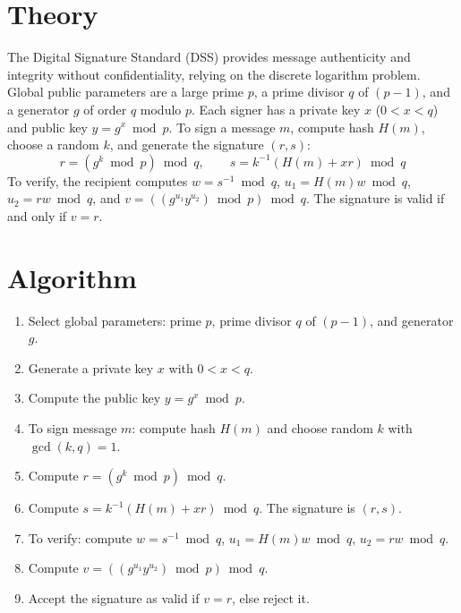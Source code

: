 \section{Theory}
The Digital Signature Standard (DSS) provides message authenticity and integrity
without confidentiality, relying on the discrete logarithm problem. Global
public parameters are a large prime $p$, a prime divisor $q$ of $(p-1)$, and a
generator $g$ of order $q$ modulo $p$. Each signer has a private key $x$
($0 < x < q$) and public key $y = g^x \bmod p$. To sign a message $m$, compute
hash $H(m)$, choose a random $k$, and generate the signature $(r, s)$:
\[
	r = (g^k \bmod p) \bmod q, \qquad s = k^{-1}(H(m) + x r) \bmod q
	\]
	To verify, the recipient computes $w = s^{-1} \bmod q$,
$u_1 = H(m) w \bmod q$, $u_2 = r w \bmod q$, and
$v = ((g^{u_1} y^{u_2}) \bmod p) \bmod q$. The signature is valid if and
only if $v = r$.

\section{Algorithm}
\begin{enumerate}
\item Select global parameters: prime $p$, prime divisor $q$ of $(p-1)$, and generator $g$.
\item Generate a private key $x$ with $0 < x < q$.
\item Compute the public key $y = g^x \bmod p$.
\item To sign message $m$: compute hash $H(m)$ and choose random $k$ with $\gcd(k,q)=1$.
\item Compute $r = (g^k \bmod p) \bmod q$.
\item Compute $s = k^{-1}(H(m) + xr) \bmod q$. The signature is $(r, s)$.
\item To verify: compute $w = s^{-1} \bmod q$, $u_1 = H(m)w \bmod q$, $u_2 = rw \bmod q$.
\item Compute $v = ((g^{u_1} y^{u_2}) \bmod p) \bmod q$.
\item Accept the signature as valid if $v = r$, else reject it.
\end{enumerate}


